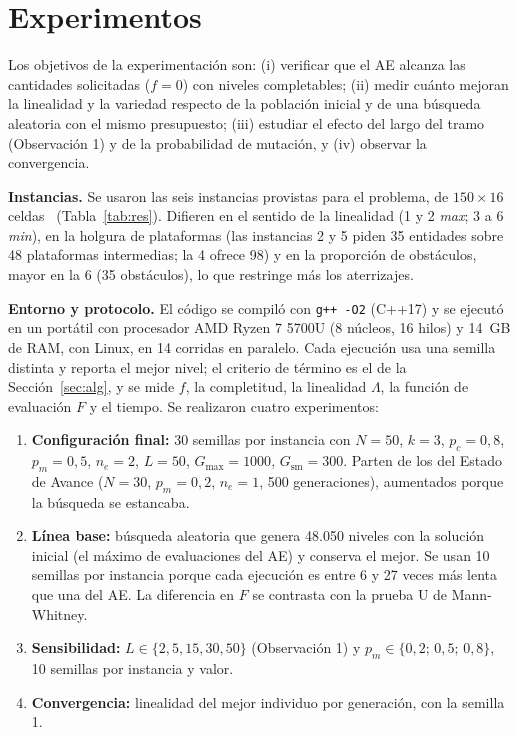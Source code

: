 \documentclass[letter, 10pt]{article}
\begin{document}
\section{Experimentos}\label{sec:exp}
Los objetivos de la experimentaci\'on son: (i) verificar que el AE alcanza las cantidades solicitadas ($f=0$) con niveles completables; (ii) medir cu\'anto mejoran la linealidad y la variedad respecto de la poblaci\'on inicial y de una b\'usqueda aleatoria con el mismo presupuesto; (iii) estudiar el efecto del largo del tramo (Observaci\'on 1) y de la probabilidad de mutaci\'on, y (iv) observar la convergencia.

\textbf{Instancias.} Se usaron las seis instancias provistas para el problema, de $150\times16$ celdas~\cite{Saavedra2026} (Tabla~\ref{tab:res}). Difieren en el sentido de la linealidad (1 y 2 \emph{max}; 3 a 6 \emph{min}), en la holgura de plataformas (las instancias 2 y 5 piden 35 entidades sobre 48 plataformas intermedias; la 4 ofrece 98) y en la proporci\'on de obst\'aculos, mayor en la 6 (35 obst\'aculos), lo que restringe m\'as los aterrizajes.

\textbf{Entorno y protocolo.} El c\'odigo se compil\'o con \texttt{g++ -O2} (C++17) y se ejecut\'o en un port\'atil con procesador AMD Ryzen 7 5700U (8 n\'ucleos, 16 hilos) y 14~GB de RAM, con Linux, en 14 corridas en paralelo. Cada ejecuci\'on usa una semilla distinta y reporta el mejor nivel; el criterio de t\'ermino es el de la Secci\'on~\ref{sec:alg}, y se mide $f$, la completitud, la linealidad $\Lambda$, la funci\'on de evaluaci\'on $F$ y el tiempo. Se realizaron cuatro experimentos:
\begin{enumerate}\setlength\itemsep{0pt}
\item \textbf{Configuraci\'on final:} 30 semillas por instancia con $N=50$, $k=3$, $p_c=0{,}8$, $p_m=0{,}5$, $n_e=2$, $L=50$, $G_{\max}=1000$, $G_{\text{sm}}=300$. Parten de los del Estado de Avance ($N=30$, $p_m=0{,}2$, $n_e=1$, 500 generaciones), aumentados porque la b\'usqueda se estancaba.
\item \textbf{L\'inea base:} b\'usqueda aleatoria que genera 48.050 niveles con la soluci\'on inicial (el m\'aximo de evaluaciones del AE) y conserva el mejor. Se usan 10 semillas por instancia porque cada ejecuci\'on es entre 6 y 27 veces m\'as lenta que una del AE. La diferencia en $F$ se contrasta con la prueba U de Mann-Whitney.
\item \textbf{Sensibilidad:} $L\in\{2,5,15,30,50\}$ (Observaci\'on 1) y $p_m\in\{0{,}2;\,0{,}5;\,0{,}8\}$, 10 semillas por instancia y valor.
\item \textbf{Convergencia:} linealidad del mejor individuo por generaci\'on, con la semilla 1.
\end{enumerate}
\end{document}
